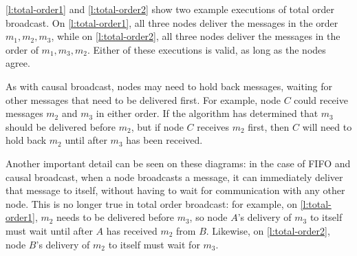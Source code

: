 \autoref{l:total-order1} and \ref{l:total-order2} show two example executions of total order broadcast.
On \autoref{l:total-order1}, all three nodes deliver the messages in the order $m_1, m_2, m_3$, while on \autoref{l:total-order2}, all three nodes deliver the messages in the order of $m_1, m_3, m_2$.
Either of these executions is valid, as long as the nodes agree.

As with causal broadcast, nodes may need to hold back messages, waiting for other messages that need to be delivered first.
For example, node $C$ could receive messages $m_2$ and $m_3$ in either order.
If the algorithm has determined that $m_3$ should be delivered before $m_2$, but if node $C$ receives $m_2$ first, then $C$ will need to hold back $m_2$ until after $m_3$ has been received.

Another important detail can be seen on these diagrams: in the case of FIFO and causal broadcast, when a node broadcasts a message, it can immediately deliver that message to itself, without having to wait for communication with any other node.
This is no longer true in total order broadcast: for example, on \autoref{l:total-order1}, $m_2$ needs to be delivered before $m_3$, so node $A$'s delivery of $m_3$ to itself must wait until after $A$ has received $m_2$ from $B$.
Likewise, on \autoref{l:total-order2}, node $B$'s delivery of $m_2$ to itself must wait for $m_3$.

